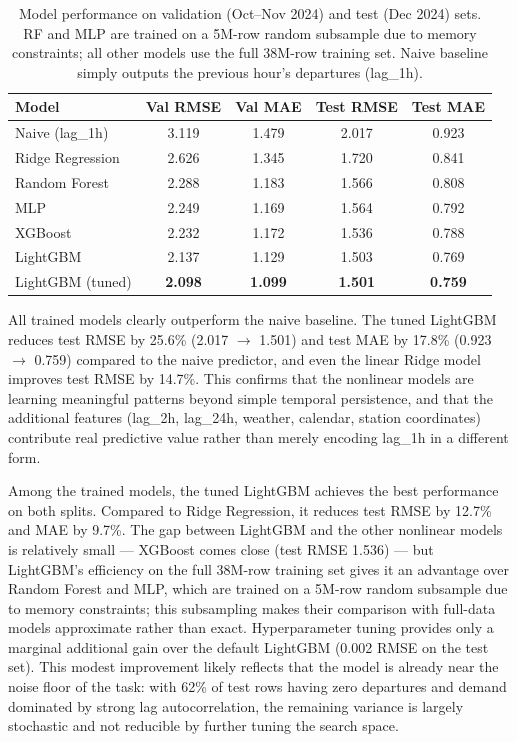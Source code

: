 \documentclass{article}
\begin{document}
\begin{table}[H]
\centering
\caption{Model performance on validation (Oct--Nov 2024) and test (Dec 2024) sets.
         RF and MLP are trained on a 5M-row random subsample due to memory
         constraints; all other models use the full 38M-row training set.
         Naive baseline simply outputs the previous hour's departures (lag\_1h).}
\label{tab:results}
\begin{tabular}{lcccc}
\toprule
Model & Val RMSE & Val MAE & Test RMSE & Test MAE \\
\midrule
Naive (lag\_1h)      & 3.119 & 1.479 & 2.017 & 0.923 \\
\midrule
Ridge Regression     & 2.626 & 1.345 & 1.720 & 0.841 \\
Random Forest        & 2.288 & 1.183 & 1.566 & 0.808 \\
MLP                  & 2.249 & 1.169 & 1.564 & 0.792 \\
XGBoost              & 2.232 & 1.172 & 1.536 & 0.788 \\
LightGBM             & 2.137 & 1.129 & 1.503 & 0.769 \\
LightGBM (tuned)     & \textbf{2.098} & \textbf{1.099} & \textbf{1.501} & \textbf{0.759} \\
\bottomrule
\end{tabular}
\end{table}

All trained models clearly outperform the naive baseline. The tuned LightGBM
reduces test RMSE by 25.6\% (2.017 $\rightarrow$ 1.501) and test MAE by
17.8\% (0.923 $\rightarrow$ 0.759) compared to the naive predictor, and even
the linear Ridge model improves test RMSE by 14.7\%. This confirms that the
nonlinear models are learning meaningful patterns beyond simple temporal
persistence, and that the additional features (lag\_2h, lag\_24h, weather,
calendar, station coordinates) contribute real predictive value rather than
merely encoding lag\_1h in a different form.

Among the trained models, the tuned LightGBM achieves the best performance
on both splits. Compared to Ridge Regression, it reduces test RMSE by 12.7\%
and MAE by 9.7\%. The gap between LightGBM and the other nonlinear models
is relatively small — XGBoost comes close (test RMSE 1.536) — but
LightGBM's efficiency on the full 38M-row training set gives it an advantage
over Random Forest and MLP, which are trained on a 5M-row random subsample
due to memory constraints; this subsampling makes their comparison with
full-data models approximate rather than exact. Hyperparameter tuning provides only a marginal additional gain over the default
LightGBM (0.002 RMSE on the test set). This modest improvement likely reflects
that the model is already near the noise floor of the task: with 62\% of
test rows having zero departures and demand dominated by strong lag
autocorrelation, the remaining variance is largely stochastic and not
reducible by further tuning the search space.
\end{document}

